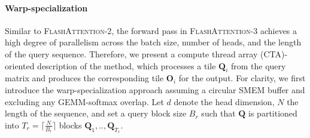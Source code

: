 \paragraph{Warp-specialization}
Similar to \textsc{FlashAttention-2}, the forward pass in \textsc{FlashAttention-3} achieves a high degree of parallelism across the batch size, number of heads, and the length of the query sequence. Therefore, we present a compute thread array (CTA)-oriented description of the method, which processes a tile $\mathbf{Q}_i$ from the query matrix and produces the corresponding tile $\mathbf{O}_i$ for the output. For clarity, we first introduce the warp-specialization approach assuming a circular SMEM buffer and excluding any GEMM-softmax overlap. Let $d$ denote the head dimension, $N$ the length of the sequence, and set a query block size $B_r$ such that $\mathbf{Q}$ is partitioned into $T_r = \lceil \frac{N}{B_r} \rceil$ blocks $\mathbf{Q}_1, .., \mathbf{Q}_{T_r}$.


